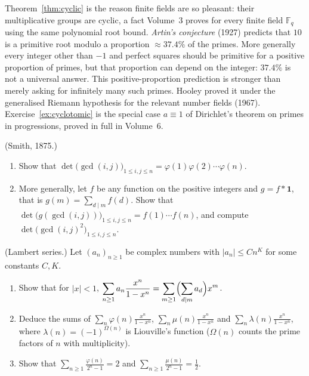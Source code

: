 \begin{beauty}
Theorem~\ref{thm:cyclic} is the reason finite fields are so pleasant: their multiplicative groups are cyclic, a fact Volume~3 proves for every finite field $\mathbb F_q$ using the same polynomial root bound. \emph{Artin's conjecture} (1927) predicts that $10$ is a primitive root modulo a proportion $\approx37.4\%$ of the primes. More generally every integer other than $-1$ and perfect squares should be primitive for a positive proportion of primes, but that proportion can depend on the integer: $37.4\%$ is not a universal answer. This positive-proportion prediction is stronger than merely asking for infinitely many such primes. Hooley proved it under the generalised Riemann hypothesis for the relevant number fields (1967). Exercise~\ref{ex:cyclotomic} is the special case $a\equiv1$ of Dirichlet's theorem on primes in progressions, proved in full in Volume~6.
\end{beauty}

\begin{exercise}[$\star\star$]\label{pb:smith}
(Smith, 1875.)
\begin{enumerate}[label=(\alph*)]
\item Show that $\det\bigl(\gcd(i,j)\bigr)_{1\le i,j\le n}=\varphi(1)\varphi(2)\cdots\varphi(n)$.
\item More generally, let $f$ be any function on the positive integers and $g=f*\mathbf1$, that is $g(m)=\sum_{d\mid m}f(d)$.
Show that $\det\bigl(g(\gcd(i,j))\bigr)_{1\le i,j\le n}=f(1)\cdots f(n)$, and compute $\det\bigl(\gcd(i,j)^2\bigr)_{1\le i,j\le n}$.
\end{enumerate}
\end{exercise}

\begin{exercise}[$\star\star$]\label{pb:lambert}
(Lambert series.) Let $(a_n)_{n\ge1}$ be complex numbers with $|a_n|\le Cn^K$ for some constants $C,K$.
\begin{enumerate}[label=(\alph*)]
\item Show that for $|x|<1$, $\displaystyle\sum_{n\ge1}a_n\frac{x^n}{1-x^n}=\sum_{m\ge1}\Bigl(\sum_{d\mid m}a_d\Bigr)x^m$.
\item Deduce the sums of $\sum_n\varphi(n)\frac{x^n}{1-x^n}$, $\sum_n\mu(n)\frac{x^n}{1-x^n}$ and $\sum_n\lambda(n)\frac{x^n}{1-x^n}$,
where $\lambda(n)=(-1)^{\Omega(n)}$ is Liouville's function ($\Omega(n)$ counts the prime factors of $n$ with multiplicity).
\item Show that $\displaystyle\sum_{n\ge1}\frac{\varphi(n)}{2^n-1}=2$ and $\displaystyle\sum_{n\ge1}\frac{\mu(n)}{2^n-1}=\frac12$.
\end{enumerate}
\end{exercise}

